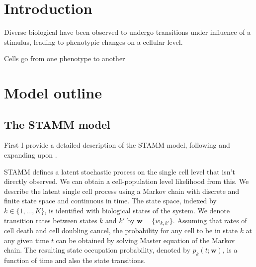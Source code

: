 \section{Introduction}
\label{sec:intro-stamm}

Diverse biological have been observed to undergo transitions under influence of a stimulus, leading to phenotypic
changes on a cellular level.  

Cells go from one phenotype to another

\section{Model outline}
\label{sec:method}

\subsection{The STAMM model}
\label{sec:mast-model}


First I provide a detailed description of the STAMM model, following and expanding upon  
\cite{Armond:2013}.

STAMM defines a latent stochastic process on the single cell level that isn't directly observed. We can obtain a cell-population level likelihood from this. We describe the latent single cell process using a Markov chain with discrete and finite state space and continuous in time. The state space, indexed by $k \in \lbrace 1, ..., K \rbrace$, is identified with biological states of the system. We denote transition rates between states $k$ and $k'$ by $\mathbf{w} = \lbrace w_{k,k'} \rbrace $. Assuming that rates of cell death and cell doubling cancel, the probability for any cell to be in state $k$ at any given time $t$ can be obtained by solving Master equation of the Markov chain. The resulting state occupation probability, denoted by $p_k(t;\mathbf{w})$, is a function of time and also the state transitions.

